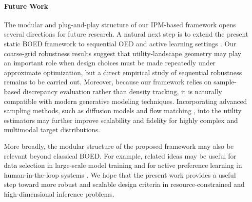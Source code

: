 \documentclass[twoside,11pt]{article}
\begin{document}
\paragraph{Future Work} The modular and plug-and-play structure of our IPM-based framework opens several directions for future research. A natural next step is to extend the present static BOED framework to sequential OED and active learning settings \citep{he2008active,dror2008sequential,mackay1992information}. Our coarse-grid robustness results suggest that utility-landscape geometry may play an important role when design choices must be made repeatedly under approximate optimization, but a direct empirical study of sequential robustness remains to be carried out. Moreover, because our framework relies on sample-based discrepancy evaluation rather than density tracking, it is naturally compatible with modern generative modeling techniques. Incorporating advanced sampling methods, such as diffusion models \citep{ho2020denoising} and flow matching \citep{lipman2022flow}, into the utility estimators may further improve scalability and fidelity for highly complex and multimodal target distributions.

More broadly, the modular structure of the proposed framework may also be relevant beyond classical BOED. For example, related ideas may be useful for data selection in large-scale model training and for active preference learning in human-in-the-loop systems \citep{sorscher2022beyond,xie2023data,rafailov2023direct,muldrew2024active}. We hope that the present work provides a useful step toward more robust and scalable design criteria in resource-constrained and high-dimensional inference problems.








\appendix
\end{document}

